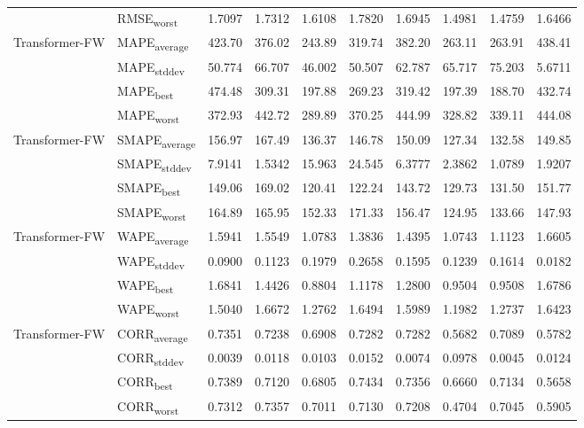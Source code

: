 {\begin{longtable}{l l c c c c c c c c}
 & RMSE\textsubscript{worst} & 1.7097 & 1.7312 & 1.6108 & 1.7820 & 1.6945 & 1.4981 & 1.4759 & 1.6466 \\
\cmidrule(lr){2-10}
\multirow{4}{*}{Transformer-FW} & MAPE\textsubscript{average} & 423.70 & 376.02 & 243.89 & 319.74 & 382.20 & 263.11 & 263.91 & 438.41 \\
 & MAPE\textsubscript{stddev} & 50.774 & 66.707 & 46.002 & 50.507 & 62.787 & 65.717 & 75.203 & 5.6711 \\
 & MAPE\textsubscript{best} & 474.48 & 309.31 & 197.88 & 269.23 & 319.42 & 197.39 & 188.70 & 432.74 \\
 & MAPE\textsubscript{worst} & 372.93 & 442.72 & 289.89 & 370.25 & 444.99 & 328.82 & 339.11 & 444.08 \\
\cmidrule(lr){2-10}
\multirow{4}{*}{Transformer-FW} & SMAPE\textsubscript{average} & 156.97 & 167.49 & 136.37 & 146.78 & 150.09 & 127.34 & 132.58 & 149.85 \\
 & SMAPE\textsubscript{stddev} & 7.9141 & 1.5342 & 15.963 & 24.545 & 6.3777 & 2.3862 & 1.0789 & 1.9207 \\
 & SMAPE\textsubscript{best} & 149.06 & 169.02 & 120.41 & 122.24 & 143.72 & 129.73 & 131.50 & 151.77 \\
 & SMAPE\textsubscript{worst} & 164.89 & 165.95 & 152.33 & 171.33 & 156.47 & 124.95 & 133.66 & 147.93 \\
\cmidrule(lr){2-10}
\multirow{4}{*}{Transformer-FW} & WAPE\textsubscript{average} & 1.5941 & 1.5549 & 1.0783 & 1.3836 & 1.4395 & 1.0743 & 1.1123 & 1.6605 \\
 & WAPE\textsubscript{stddev} & 0.0900 & 0.1123 & 0.1979 & 0.2658 & 0.1595 & 0.1239 & 0.1614 & 0.0182 \\
 & WAPE\textsubscript{best} & 1.6841 & 1.4426 & 0.8804 & 1.1178 & 1.2800 & 0.9504 & 0.9508 & 1.6786 \\
 & WAPE\textsubscript{worst} & 1.5040 & 1.6672 & 1.2762 & 1.6494 & 1.5989 & 1.1982 & 1.2737 & 1.6423 \\
\cmidrule(lr){2-10}
\multirow{4}{*}{Transformer-FW} & CORR\textsubscript{average} & 0.7351 & 0.7238 & 0.6908 & 0.7282 & 0.7282 & 0.5682 & 0.7089 & 0.5782 \\
 & CORR\textsubscript{stddev} & 0.0039 & 0.0118 & 0.0103 & 0.0152 & 0.0074 & 0.0978 & 0.0045 & 0.0124 \\
 & CORR\textsubscript{best} & 0.7389 & 0.7120 & 0.6805 & 0.7434 & 0.7356 & 0.6660 & 0.7134 & 0.5658 \\
 & CORR\textsubscript{worst} & 0.7312 & 0.7357 & 0.7011 & 0.7130 & 0.7208 & 0.4704 & 0.7045 & 0.5905 \\

\end{longtable}}
